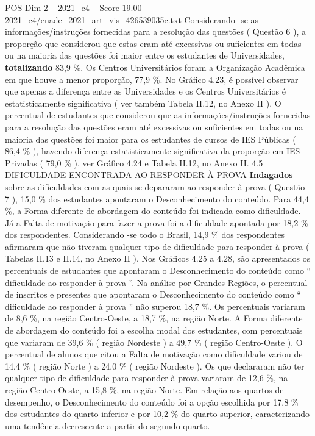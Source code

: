 \begin{textsample}{POS Dim 2 – 2021\_c4 – Score 19.00 – 2021\_c4/enade\_2021\_art\_vis\_426539035c.txt}
Considerando -se as informações/instruções fornecidas para a resolução das questões ( Questão 6 ), a proporção que considerou que estas eram até excessivas ou suficientes em todas ou na maioria das questões foi maior entre os estudantes de Universidades, \textbf{totalizando} 83,9 \%.
Os Centros Universitários foram a Organização Acadêmica em que houve a menor proporção, 77,9 \%.
No Gráfico 4.23, é possível observar que apenas a diferença entre as Universidades e os Centros Universitários é estatisticamente significativa ( ver também Tabela II.12, no Anexo II ).
O percentual de estudantes que considerou que as informações/instruções fornecidas para a resolução das questões eram até excessivas ou suficientes em todas ou na maioria das questões foi maior para os estudantes de cursos de IES Públicas ( 86,4 \% ), havendo diferença estatisticamente significativa da proporção em IES Privadas ( 79,0 \% ), ver Gráfico 4.24 e Tabela II.12, no Anexo II. 4.5 DIFICULDADE ENCONTRADA AO RESPONDER À PROVA \textbf{Indagados} sobre as dificuldades com as quais se depararam ao responder à prova ( Questão 7 ), 15,0 \% dos estudantes apontaram o Desconhecimento do conteúdo.
Para 44,4 \%, a Forma diferente de abordagem do conteúdo foi indicada como dificuldade.
Já a Falta de motivação para fazer a prova foi a dificuldade apontada por 18,2 \% dos respondentes.
Considerando -se todo o Brasil, 14,9 \% dos respondentes afirmaram que não tiveram qualquer tipo de dificuldade para responder à prova ( Tabelas II.13 e II.14, no Anexo II ).
Nos Gráficos 4.25 a 4.28, são apresentados os percentuais de estudantes que apontaram o Desconhecimento do conteúdo como “ dificuldade ao responder à prova ”.
Na análise por Grandes Regiões, o percentual de inscritos e presentes que apontaram o Desconhecimento do conteúdo como “ dificuldade ao responder à prova ” não superou 18,7 \%.
Os percentuais variaram de 8,6 \%, na região Centro-Oeste, a 18,7 \%, na região Norte.
A Forma diferente de abordagem do conteúdo foi a escolha modal dos estudantes, com percentuais que variaram de 39,6 \% ( região Nordeste ) a 49,7 \% ( região Centro-Oeste ).
O percentual de alunos que citou a Falta de motivação como dificuldade variou de 14,4 \% ( região Norte ) a 24,0 \% ( região Nordeste ).
Os que declararam não ter qualquer tipo de dificuldade para responder à prova variaram de 12,6 \%, na região Centro-Oeste, a 15,8 \%, na região Norte.
Em relação aos quartos de desempenho, o Desconhecimento do conteúdo foi a opção escolhida por 17,8 \% dos estudantes do quarto inferior e por 10,2 \% do quarto superior, caracterizando uma tendência decrescente a partir do segundo quarto.

\end{textsample}
